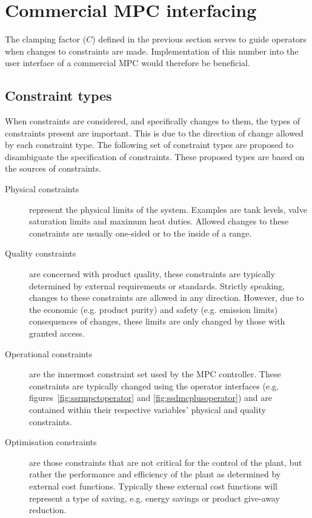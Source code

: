 \section{Commercial MPC interfacing}
The clamping factor ($C$) defined in the previous section serves to guide operators when changes to constraints are made.
Implementation of this number into the user interface of a commercial MPC would therefore be beneficial.

\subsection{Constraint types}
When constraints are considered, and specifically changes to them, the types of constraints present are important.
This is due to the direction of change allowed by each constraint type.
The following set of constraint types are proposed to disambiguate the specification of constraints.
These proposed types are based on the sources of constraints.
\begin{description}
  \item [Physical constraints] represent the physical limits of the system.
  Examples are tank levels, valve saturation limits and maximum heat duties.
  Allowed changes to these constraints are usually one-sided or to the inside of a range.
  \item [Quality constraints] are concerned with product quality, these constraints are typically determined by external requirements or standards.
  Strictly speaking, changes to these constraints are allowed in any direction.
  However, due to the economic (e.g. product purity) and safety (e.g. emission limits) consequences of changes, these limits are only changed by those with granted access.
  \item [Operational constraints] are the innermost constraint set used by the MPC controller.
  These constraints are typically changed using the operator interfaces (e.g. figures~\ref{fig:ssrmpctoperator} and \ref{fig:ssdmcplusoperator}) and are contained within their respective variables' physical and quality constraints.
  \item [Optimisation constraints] are those constraints that are not critical for the control of the plant, but rather the performance and efficiency of the plant as determined by external cost functions.
  Typically these external cost functions will represent a type of saving, e.g. energy savings or product give-away reduction.
\end{description}

